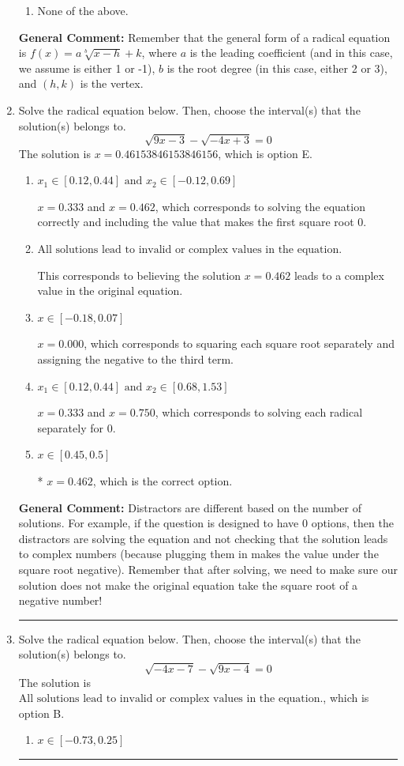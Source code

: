 \documentclass{extbook}[14pt]
\newcommand{\litem}[1]{\item #1

\rule{\textwidth}{0.4pt}}
\begin{document}
\begin{enumerate}
{\begin{enumerate}[label=\Alph*.]
\begin{multicols}{2}
\end{multicols}\item None of the above.\end{enumerate}
\textbf{General Comment:} Remember that the general form of a radical equation is $ f(x) = a \sqrt[b]{x - h} + k $, where $a$ is the leading coefficient (and in this case, we assume is either 1 or -1), $b$ is the root degree (in this case, either 2 or 3), and $(h, k)$ is the vertex.
}
\litem{
Solve the radical equation below. Then, choose the interval(s) that the solution(s) belongs to.
\[ \sqrt{9 x - 3} - \sqrt{-4 x + 3} = 0 \]The solution is \( x = 0.46153846153846156 \), which is option E.\begin{enumerate}[label=\Alph*.]
\item \( x_1 \in [0.12, 0.44] \text{ and } x_2 \in [-0.12,0.69] \)

$x = 0.333$ and $x = 0.462$, which corresponds to solving the equation correctly and including the value that makes the first square root 0.
\item \( \text{All solutions lead to invalid or complex values in the equation.} \)

This corresponds to believing the solution $x = 0.462$ leads to a complex value in the original equation.
\item \( x \in [-0.18,0.07] \)

$x = 0.000$, which corresponds to squaring each square root separately and assigning the negative to the third term.
\item \( x_1 \in [0.12, 0.44] \text{ and } x_2 \in [0.68,1.53] \)

$x = 0.333$ and $x = 0.750$, which corresponds to solving each radical separately for 0.
\item \( x \in [0.45,0.5] \)

* $x = 0.462$, which is the correct option.
\end{enumerate}

\textbf{General Comment:} Distractors are different based on the number of solutions. For example, if the question is designed to have 0 options, then the distractors are solving the equation and not checking that the solution leads to complex numbers (because plugging them in makes the value under the square root negative). Remember that after solving, we need to make sure our solution does not make the original equation take the square root of a negative number!
}
\litem{
Solve the radical equation below. Then, choose the interval(s) that the solution(s) belongs to.
\[ \sqrt{-4 x - 7} - \sqrt{9 x - 4} = 0 \]The solution is \( \text{All solutions lead to invalid or complex values in the equation.} \), which is option B.\begin{enumerate}[label=\Alph*.]
\item \( x \in [-0.73,0.25] \)


\end{enumerate}}
\end{enumerate}
\end{document}
